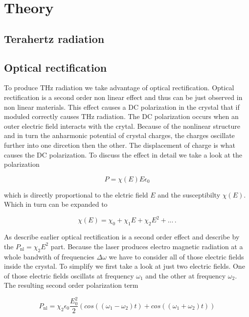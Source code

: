 \chapter{Theory}
\section{Terahertz radiation}

\section{Optical rectification}\label{sec:optic_ref}
To produce $\si{\tera\hertz}$ radiation we take advantage of optical rectification.
Optical rectification is a second order non linear effect and thus can be just observed in non linear materials.
This effect causes a DC polarization in the crystal that if moduled correctly causes $\si{\tera\hertz}$ radiation.
The DC polarization occurs when an outer electric field interacts with the crytal.
Because of the nonlinear structure and in turn the anharmonic potential of crystal charges, the charges oscillate further into one dircetion then the other.
The displacement of charge is what causes the DC polarization.
To discuss the effect in detail we take a look at the polarization

\begin{equation}
P = \chi(E) E \epsilon_0
\end{equation}

which is directly proportional to the elctric field $E$ and the susceptibilty $\chi(E)$.
Which in turn can be expanded to 

\begin{equation}
    \chi(E) = \chi_0 + \chi_1 E +\chi_2 E^2 + ...   \, .
\end{equation}

As describe earlier optical rectification is a second order effect and describe by the $P_\text{nl} = \chi_2 E^2$ part.
Because the laser produces electro magnetic radiation at a whole bandwith of frequencies $\Delta\omega$ we have to consider all of those electric fields inside the crystal.
To simplify we first take a look at just two electric fields.
One of those electric fields oscillats at frequency $\omega_1$ and the other at frequency $\omega_2$.
The resulting second order polarization term 

\begin{equation}
    P_\text{nl} = \chi_2 \epsilon_0 \frac{E_0^2}{2}\left(cos((\omega_1 - \omega_2)t) + cos((\omega_1 + \omega_2)t)\right)
\end{equation}

